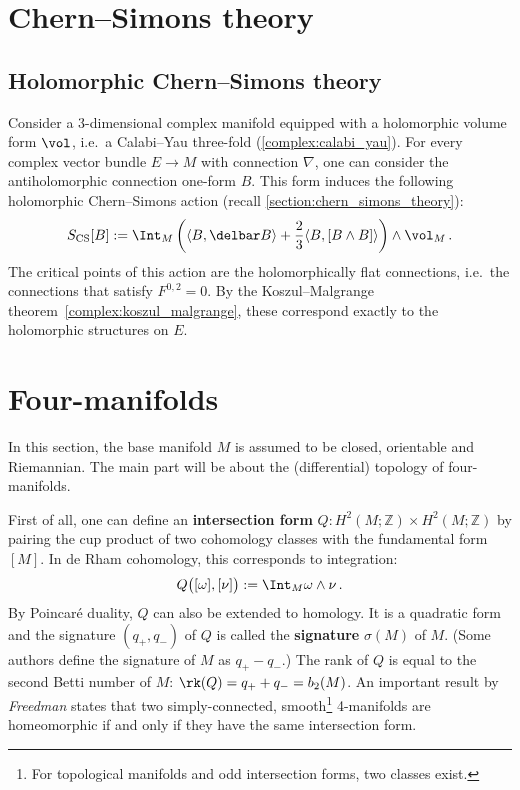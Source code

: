 
\section{Chern--Simons theory}
\subsection{Holomorphic Chern--Simons theory}

    Consider a 3-dimensional complex manifold equipped with a holomorphic volume form $\vol$, i.e.~a Calabi--Yau three-fold (\cref{complex:calabi_yau}). For every complex vector bundle $E\rightarrow M$ with connection $\nabla$, one can consider the antiholomorphic connection one-form $B$. This form induces the following holomorphic Chern--Simons action (recall \cref{section:chern_simons_theory}):
    \begin{gather}
        S_{\text{CS}}[B]:=\Int_M\left(\langle B,\delbar B \rangle+\frac{2}{3}
        \langle B,[B\wedge B] \rangle\right)\wedge\vol_M\,.
    \end{gather}
    The critical points of this action are the holomorphically flat connections, i.e.~the connections that satisfy $F^{0,2}=0$. By the Koszul--Malgrange theorem~\ref{complex:koszul_malgrange}, these correspond exactly to the holomorphic structures on $E$.

\section{Four-manifolds}

    In this section, the base manifold $M$ is assumed to be closed, orientable and Riemannian. The main part will be about the (differential) topology of four-manifolds.

    First of all, one can define an \textbf{intersection form} $Q:H^2(M;\mathbb{Z})\times H^2(M;\mathbb{Z})$ by pairing the cup product of two cohomology classes with the fundamental form $[M]$. In de Rham cohomology, this corresponds to integration:
    \begin{gather}
        Q\bigl([\omega],[\nu]\bigr) := \Int_M\omega\wedge\nu\,.
    \end{gather}
    By Poincar\'e duality, $Q$ can also be extended to homology. It is a quadratic form and the signature $(q_+,q_-)$ of $Q$ is called the \textbf{signature} $\sigma(M)$ of $M$. (Some authors define the signature of $M$ as $q_+-q_-$.) The rank of $Q$ is equal to the second Betti number of $M$: $\rk(Q)=q_++q_-=b_2(M)$. An important result by \textit{Freedman} states that two simply-connected, smooth\footnote{For topological manifolds and odd intersection forms, two classes exist.} 4-manifolds are homeomorphic if and only if they have the same intersection form.

